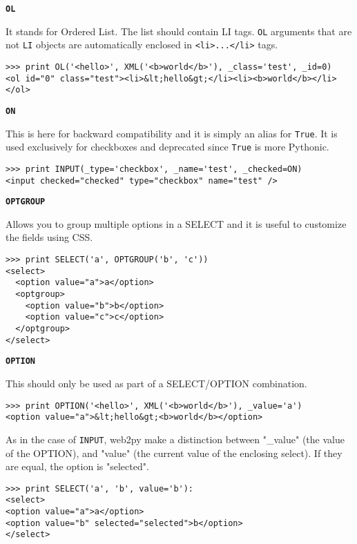 \documentclass[justified,sixbynine,notoc]{tufte-book}
\def\ft{\small\tt}
\def\inxx#1{\index{#1}}
\begin{document}
\begin{fullwidth}
{\bf {\ft OL}}

It stands for Ordered List. The list should contain LI tags. {\ft OL} arguments that are not {\ft LI} objects are automatically enclosed in {\ft <li>...</li>} tags.

\inxx{OL}
\begin{lstlisting}
>>> print OL('<hello>', XML('<b>world</b>'), _class='test', _id=0)
<ol id="0" class="test"><li>&lt;hello&gt;</li><li><b>world</b></li></ol>
\end{lstlisting}

{\bf {\ft ON}}

This is here for backward compatibility and it is simply an alias for {\ft True}. It is used exclusively for checkboxes and deprecated since {\ft True} is more Pythonic.

\inxx{ON}
\begin{lstlisting}
>>> print INPUT(_type='checkbox', _name='test', _checked=ON)
<input checked="checked" type="checkbox" name="test" />
\end{lstlisting}

{\bf {\ft OPTGROUP}}

Allows you to group multiple options in a SELECT and it is useful to customize the fields using CSS.

\inxx{OPTGROUP}
\begin{lstlisting}
>>> print SELECT('a', OPTGROUP('b', 'c'))
<select>
  <option value="a">a</option>
  <optgroup>
    <option value="b">b</option>
    <option value="c">c</option>
  </optgroup>
</select>
\end{lstlisting}

{\bf {\ft OPTION}}

This should only be used as part of a SELECT/OPTION combination.

\inxx{OPTION}
\begin{lstlisting}
>>> print OPTION('<hello>', XML('<b>world</b>'), _value='a')
<option value="a">&lt;hello&gt;<b>world</b></option>
\end{lstlisting}

As in the case of {\ft INPUT}, web2py make a distinction between "\_value" (the value of the OPTION), and "value" (the current value of the enclosing select). If they are equal, the option is "selected".

\inxx{selected}
\begin{lstlisting}
>>> print SELECT('a', 'b', value='b'):
<select>
<option value="a">a</option>
<option value="b" selected="selected">b</option>
</select>
\end{lstlisting}


\end{fullwidth}
\end{document}
